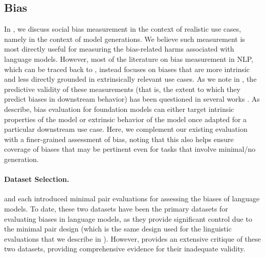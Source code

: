 \hypertarget{targeted-bias}{\subsection{Bias}}
\label{sec:targeted-bias}

In , we discuss social bias measurement in the context of realistic use cases, namely in the context of model generations. 
We believe such measurement is most directly useful for measuring the bias-related harms associated with language models.
However, most of the literature on bias measurement in NLP, which can be traced back to \citet{bolukbasi2016man}, instead focuses on biases that are more intrinsic and less directly grounded in extrinsically relevant use cases.
As we note in , the predictive validity of these measurements (that is, the extent to which they predict biases in downstream behavior) has been questioned in several works \cite[\eg][]{goldfarb2021intrinsic, steed2022upstream}.
As \citet[][\S5.1]{bommasani2021opportunities} describe, bias evaluation for foundation models can either target intrinsic properties of the model or extrinsic behavior of the model once adapted for a particular downstream use case. 
Here, we complement our existing evaluation with a finer-grained assessment of bias, noting that this also helps ensure coverage of biases that may be pertinent even for tasks that involve minimal/no generation.

\paragraph{Dataset Selection.}
\citet{nadeem2020stereoset} and \citet{nangia2020crows} each introduced minimal pair evaluations for assessing the biases of language models.
To date, these two datasets have been the primary datasets for evaluating biases in language models, as they provide significant control due to the minimal pair design (which is the same design used for the linguistic evaluations that we describe in ).
However, \citet{blodgett2021norwegian} provides an extensive critique of these two datasets, providing comprehensive evidence for their inadequate validity.

